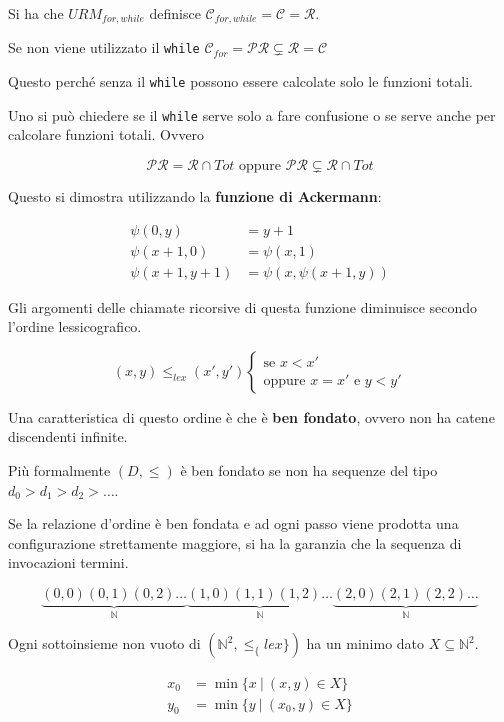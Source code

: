 Si ha che $URM_{for, while}$ definisce $\mathcal{C}_{for,while} = \mathcal{C} = \mathcal{R} $.

Se non viene utilizzato il \texttt{while} $\mathcal{C}_{for} = \mathcal{PR} \subsetneq \mathcal{R} = \mathcal{C}$

Questo perché senza il \texttt{while} possono essere calcolate solo le funzioni totali.

Uno si può chiedere se il \texttt{while} serve solo a fare confusione o se serve anche per calcolare funzioni totali. Ovvero

$$
\mathcal{PR} = \mathcal{R} \cap Tot \text{ oppure }\mathcal{PR} \subsetneq\mathcal{R}\cap Tot
$$

Questo si dimostra utilizzando la \textbf{funzione di Ackermann}:

\begin{align*}
\psi(0,y) &= y+1 \\
\psi(x+1, 0) &= \psi(x,1) \\
\psi(x+1, y+1) &= \psi(x, \psi(x+1,y))
\end{align*}

Gli argomenti delle chiamate ricorsive di questa funzione diminuisce secondo l'ordine lessicografico.

$$
(x,y) \leq_{lex} (x',y') \begin{cases}
\text{se } x < x'\\
\text{oppure } x = x' \text{ e } y < y'
\end{cases}
$$

Una caratteristica di questo ordine è che è \textbf{ben fondato}, ovvero non ha catene discendenti infinite. 

Più formalmente $(D, \leq)$ è ben fondato se non ha sequenze del tipo $d_0 > d_1 > d_2 > \ldots $.

Se la relazione d'ordine è ben fondata e ad ogni passo viene prodotta una configurazione strettamente maggiore, si ha la garanzia che la sequenza di invocazioni termini.

$$
\underbrace{(0,0)(0,1)(0,2) \ldots }_{\mathbb{N}}\underbrace{(1,0)(1,1)(1,2) \ldots }_{\mathbb{N}}\underbrace{(2,0)(2,1)(2,2) \ldots }_{\mathbb{N}}
$$

Ogni sottoinsieme non vuoto di $(\mathbb{N}^{2}, \leq_\{lex\})$ ha un minimo dato $X \subseteq \mathbb{N}^{2}$.

\begin{align*}
x_0 &= \min\{x \: | \: (x,y) \in X\} \\
y_0 &= \min\{y \: | \: (x_0, y) \in X\}
\end{align*}

